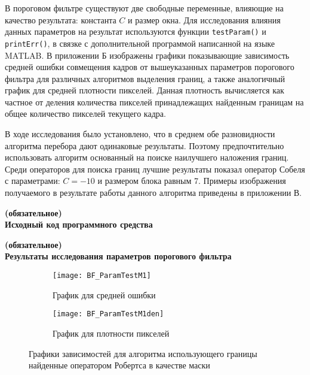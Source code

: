 В пороговом фильтре существуют две свободные переменные, влияющие на качество результата: константа $C$ и размер окна. Для исследования влияния данных параметров на результат используются функции \texttt{testParam()} и \texttt{printErr()}, в связке с дополнительной программой написанной на языке MATLAB. В приложении Б изображены графики показывающие зависимость средней ошибки совмещения кадров от вышеуказанных параметров порогового фильтра для различных алгоритмов выделения границ, а также аналогичный график для средней плотности пикселей. Данная плотность вычисляется как частное от деления количества пикселей принадлежащих найденным границам на общее количество пикселей текущего кадра.

В ходе исследования было установлено, что в среднем обе разновидности алгоритма перебора дают одинаковые результаты. Поэтому предпочтительно использовать алгоритм основанный на поиске наилучшего наложения границ. Среди операторов для поиска границ лучшие результаты показал оператор Собеля с параметрами: $C=-10$ и размером блока равным 7. Примеры изображения получаемого в результате работы данного алгоритма приведены в приложении В.

\setcounter{section}{1}
\renewcommand{\thesection}{\Asbuk{section}}
\begin{center}
	\vspace{-1em}
	\textbf{ (обязательное)}\\	
	\textbf{Исходный код программного средства}
\end{center}
\lstset{
	basicstyle=\footnotesize\ttfamily,
	breaklines=true, 
	language=C++,
	numbers=left,                    
	numbersep=5pt,
	tabsize=2,			
}



\setcounter{section}{2}
\setcounter{figure}{0}
\begin{center}
	\vspace{-1em}
	\textbf{ (обязательное)}\\	
	\textbf{Результаты исследования параметров порогового фильтра}
\end{center}
\begin{figure}[h]
	\centering
	\begin{subfigure}{0.45\textwidth}  
		\centering
		\texttt{[image: BF\_ParamTestM1]}
		\caption*{График для средней ошибки}
	\end{subfigure}    
	\begin{subfigure}{0.45\textwidth}  
		\centering
		\texttt{[image: BF\_ParamTestM1den]}        
		\caption*{График для плотности пикселей}
	\end{subfigure}
	\caption{Графики зависимостей для алгоритма использующего границы найденные оператором Робертса в качестве маски}
	\label{fig:PT_BF_M1}
\end{figure}

